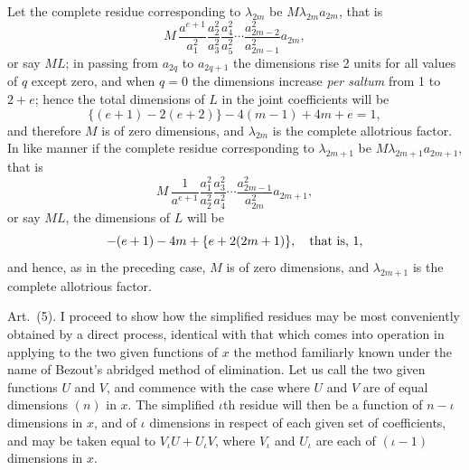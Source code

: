 \documentclass[11pt]{article}
\newcommand{\art}[1]{\par\smallskip\noindent Art.~(#1).\quad}
\begin{document}
Let the complete residue corresponding to $\lambda_{2m}$ be $M\lambda_{2m}a_{2m}$, that is
\[
M\,\frac{a^{e+1}}{a_1^2}\frac{a_2^2}{a_3^2}\frac{a_4^2}{a_5^2}\cdots
\frac{a_{2m-2}^2}{a_{2m-1}^2}a_{2m},
\]
or say $ML$; in passing from $a_{2q}$ to $a_{2q+1}$ the dimensions rise 2 units for all values of $q$ except zero, and when $q=0$ the dimensions increase \emph{per saltum} from 1 to $2+e$; hence the total dimensions of $L$ in the joint coefficients will be
\[
\{(e+1)-2(e+2)\}-4(m-1)+4m+e=1,
\]
and therefore $M$ is of zero dimensions, and $\lambda_{2m}$ is the complete allotrious factor. In like manner if the complete residue corresponding to $\lambda_{2m+1}$ be $M\lambda_{2m+1}a_{2m+1}$, that is
\[
M\,\frac1{a^{e+1}}\frac{a_1^2}{a_2^2}\frac{a_3^2}{a_4^2}\cdots
\frac{a_{2m-1}^2}{a_{2m}^2}a_{2m+1},
\]
or say $ML$, the dimensions of $L$ will be
\[
-(e+1)-4m+\{e+2(2m+1)\},\quad\hbox{that is, }1,
\]
and hence, as in the preceding case, $M$ is of zero dimensions, and $\lambda_{2m+1}$ is the complete allotrious factor.

\art{5} I proceed to show how the simplified residues may be most conveniently obtained by a direct process, identical with that which comes into operation in applying to the two given functions of $x$ the method familiarly known under the name of Bezout's abridged method of elimination. Let us call the two given functions $U$ and $V$, and commence with the case where $U$ and $V$ are of equal dimensions $(n)$ in $x$. The simplified $\iota$th residue will then be a function of $n-\iota$ dimensions in $x$, and of $\iota$ dimensions in respect of each given set of coefficients, and may be taken equal to $V_\iota U+U_\iota V$, where $V_\iota$ and $U_\iota$ are each of $(\iota-1)$ dimensions in $x$.
\end{document}
